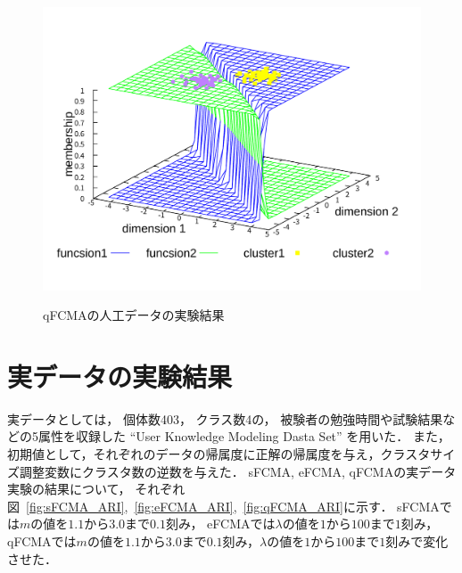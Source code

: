 \documentclass[twocolumn, a4paper]{icethesisabst}
\begin{document}
\begin{figure}[htbp]
\begin{minipage}{0.4\hsize}
  \includegraphics[width=\linewidth]{qFCMA-Em11-Lambda10.pdf}
  \label{fig:qFCMA-Em11-Lambda10}
 \end{minipage}
 \vspace*{0.2cm}
 \caption{qFCMAの人工データの実験結果}
 \label{fig:qFCMA}
\end{figure}


\section{実データの実験結果}
実データとしては，
個体数403，
クラス数4の，
被験者の勉強時間や試験結果などの5属性を収録した
``User Knowledge Modeling Dasta Set''
を用いた．
また，初期値として，それぞれのデータの帰属度に正解の帰属度を与え，クラスタサイズ調整変数にクラスタ数の逆数を与えた．
sFCMA, eFCMA, qFCMAの実データ実験の結果について，
それぞれ図~\ref{fig:sFCMA_ARI},~\ref{fig:eFCMA_ARI},~\ref{fig:qFCMA_ARI}に示す．
sFCMAでは$m$の値を$1.1$から$3.0$まで$0.1$刻み，
eFCMAでは$\lambda$の値を$1$から$100$まで$1$刻み，
qFCMAでは$m$の値を$1.1$から$3.0$まで$0.1$刻み，$\lambda$の値を$1$から$100$まで$1$刻みで変化させた．
\end{document}
